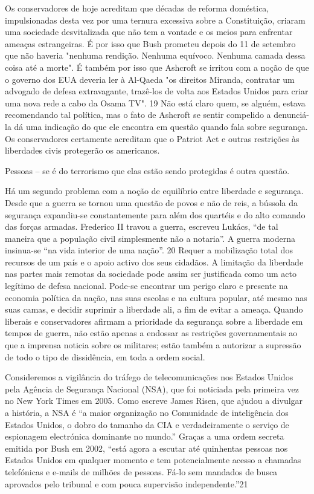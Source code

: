  \par 
Os conservadores de hoje acreditam que décadas de reforma doméstica, impulsionadas desta vez por uma ternura excessiva sobre a Constituição, criaram uma sociedade desvitalizada que não tem a vontade e os meios para enfrentar ameaças estrangeiras. É por isso que Bush prometeu depois do {\color{blue}11} de setembro que não haveria "nenhuma rendição. Nenhuma equívoco. Nenhuma camada dessa coisa até a morte". É também por isso que Ashcroft se irritou com a noção de que o governo dos EUA deveria ler à Al-Qaeda "os direitos Miranda, contratar um advogado de defesa extravagante, trazê-los de volta aos Estados Unidos para criar uma nova rede a cabo da Osama TV". {\color{blue}19} Não está claro quem, se alguém, estava recomendando tal política, mas o fato de Ashcroft se sentir compelido a denunciá-la dá uma indicação do que ele encontra em questão quando fala sobre segurança. Os conservadores certamente acreditam que o Patriot Act e outras restrições às liberdades civis protegerão os americanos.
 \par 
Pessoas – se é do terrorismo que elas estão sendo protegidas é outra questão.
 \par 
Há um segundo problema com a noção de equilíbrio entre liberdade e segurança. Desde que a guerra se tornou uma questão de povos e não de reis, a bússola da segurança expandiu-se constantemente para além dos quartéis e do alto comando das forças armadas. Frederico II travou a guerra, escreveu Lukács, “de tal maneira que a população civil simplesmente não a notaria”. A guerra moderna insinua-se “na vida interior de uma nação”. {\color{blue}20} Requer a mobilização total dos recursos de um país e o apoio activo dos seus cidadãos. A limitação da liberdade nas partes mais remotas da sociedade pode assim ser justificada como um acto legítimo de defesa nacional. Pode-se encontrar um perigo claro e presente na economia política da nação, nas suas escolas e na cultura popular, até mesmo nas suas camas, e decidir suprimir a liberdade ali, a fim de evitar a ameaça. Quando liberais e conservadores afirmam a prioridade da segurança sobre a liberdade em tempos de guerra, não estão apenas a endossar as restrições governamentais ao que a imprensa noticia sobre os militares; estão também a autorizar a supressão de todo o tipo de dissidência, em toda a ordem social.
 \par 
Consideremos a vigilância do tráfego de telecomunicações nos Estados Unidos pela Agência de Segurança Nacional (NSA), que foi noticiada pela primeira vez no New York Times em 2005. Como escreve James Risen, que ajudou a divulgar a história, a NSA é “a maior organização no Comunidade de inteligência dos Estados Unidos, o dobro do tamanho da CIA e verdadeiramente o serviço de espionagem electrónica dominante no mundo.” Graças a uma ordem secreta emitida por Bush em 2002, “está agora a escutar até quinhentas pessoas nos Estados Unidos em qualquer momento e tem potencialmente acesso a chamadas telefónicas e e-mails de milhões de pessoas. Fá-lo sem mandados de busca aprovados pelo tribunal e com pouca supervisão independente.”{\color{blue}21}
